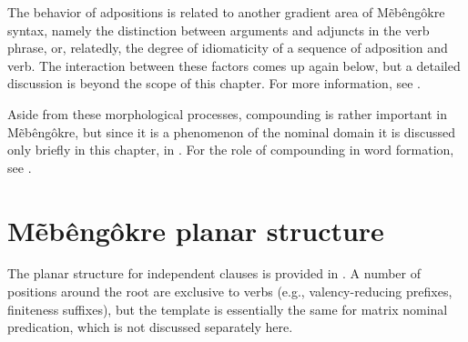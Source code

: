 \documentclass[output=paper]{langscibook}
\begin{document}
The behavior of adpositions is related to another gradient area of Mẽbêngô\-kre syntax, namely the distinction between arguments and adjuncts in the verb phrase, or, relatedly, the degree of idiomaticity of a sequence of adposition and verb. The interaction between these factors comes up again below, but a detailed discussion is beyond the scope of this chapter. For more information, see \citet{salanova:bogota}.

Aside from these morphological processes, compounding is rather important in Mẽbêngôkre, but since it is a phenomenon of the nominal domain it is discussed only briefly in this chapter, in . For the role of compounding in word formation, see \citet{salanova-nikulin:loans}.

\section{Mẽbêngôkre planar structure}
\label{planar}

The planar structure for independent clauses is provided in . A number of positions around the root are exclusive to verbs (e.g., valency-reducing prefixes, finiteness suffixes), but the template is essentially the same for matrix nominal predication, which is not discussed separately here.

\end{document}
